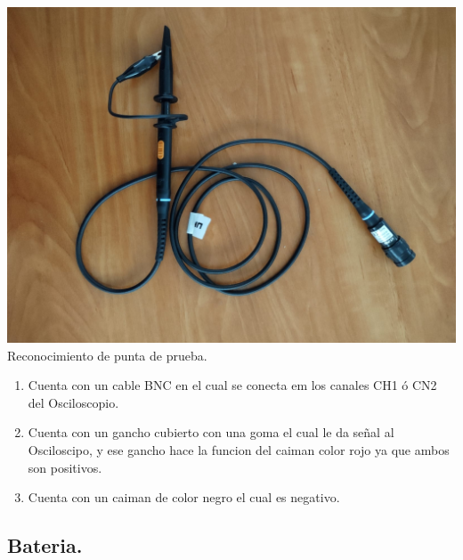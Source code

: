 \documentclass[10pt]{article}
\begin{document}
\begin{multicols}{2}
\begin{center}
\includegraphics[scale=0.1]{Imagenes/prueba.png}\\
Reconocimiento de punta de prueba.
\begin{enumerate}
\item Cuenta con un cable BNC en el cual se conecta em los canales CH1 ó CN2 del Osciloscopio.
\item Cuenta con un gancho cubierto con una goma el cual le  da señal al Osciloscipo, y ese gancho hace la funcion del caiman color rojo ya que ambos son positivos.
\item Cuenta con un caiman de color negro el cual es negativo.
\end{enumerate}
\end{center}

\subsection{Bateria.}


\end{multicols}
\end{document}
